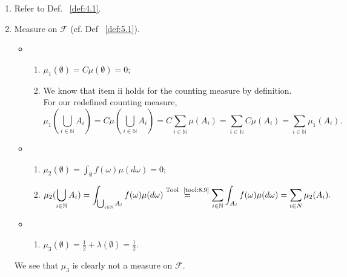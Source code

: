 \begin{exercise}[]
    \label{ex:mock1}
    \begin{enumerate}[label=(\alph*)] \hfill
        \item Refer to Def. ~\ref{def:4.1}.

        \item Measure on $\mathcal{F}$ (cf. Def ~\ref{def:5.1}).
            \begin{itemize}
                \item 
                    \begin{enumerate}[label=(\roman*)]
                        \item $\mu_1(\emptyset) = C\mu(\emptyset)= 0$;
                        \item We know that item ii holds for the counting measure by definition. For our redefined
                            counting measure,
                            \[
                            \mu_1(\bigcup_{i \in \mathbb{N}} A_i) = C\mu(\bigcup_{i \in \mathbb{N}} A_i)
                            = C \sum_{i \in \mathbb{N}}^{ } \mu(A_i) = \sum_{i \in \mathbb{N}}^{ } C\mu(A_i)
                            = \sum_{i \in \mathbb{N}}^{ } \mu_1(A_i)
                            .\] 
                    \end{enumerate}

                \item
                    \begin{enumerate}[label=(\roman*)]
                        \item $\mu_2(\emptyset) = \int_{\emptyset} f(\omega)\mu(d\omega) = 0$;
                        \item 
                            \[
                            \mu_2(\bigcup_{i \in \mathbb{N}} A_i) = \int_{\bigcup_{i \in \mathbb{N}} A_i} f(\omega)\mu(d\omega)
                            \stackrel{\text{Tool ~\ref{tool:8.9}}}
                            {=} \sum_{i \in \mathbb{N}}^{ }\int_{A_i}  f(\omega)\mu(d\omega) 
                            = \sum_{i \in N}^{ } \mu_2(A_i)
                            .\] 
                    \end{enumerate}

                \item
                    \begin{enumerate}[label=(\roman*)]
                        \item $\mu_3(\emptyset) = \frac{1}{2} + \lambda(\emptyset) = \frac{1}{2}$. 
                    \end{enumerate}
            \end{itemize}
            We see that  $\mu_3$ is clearly not a measure on $\mathcal{F}$.


\end{enumerate}
\end{exercise}
